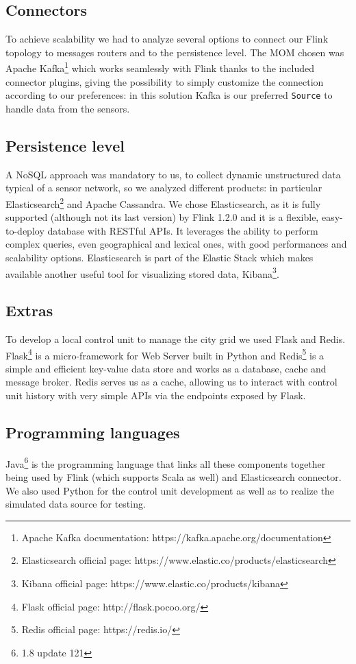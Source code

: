 \subsection{Connectors}
To achieve scalability we had to analyze several options to connect our Flink topology to messages routers and to the persistence level. The MOM chosen was Apache Kafka\footnote{Apache Kafka documentation: https://kafka.apache.org/documentation} which works seamlessly with Flink thanks to the included connector plugins, giving the possibility to simply customize the connection according to our preferences: in this solution Kafka is our preferred \texttt{Source} to handle data from the sensors. 
\subsection{Persistence level}
A NoSQL approach was mandatory to us, to collect dynamic unstructured data typical of a sensor network, so we analyzed different products: in particular Elasticsearch\footnote{Elasticsearch official page: https://www.elastic.co/products/elasticsearch} and Apache Cassandra. We chose Elasticsearch, as it is fully supported (although not its last version) by Flink 1.2.0 and it is a flexible, easy-to-deploy database with RESTful APIs. It leverages the ability to perform complex queries, even geographical and lexical ones, with good performances and scalability options. Elasticsearch is part of the Elastic Stack which makes available another useful tool for visualizing stored data, Kibana\footnote{Kibana official page: https://www.elastic.co/products/kibana}.

\subsection{Extras}
To develop a local control unit to manage the city grid we used Flask and Redis. Flask\footnote{Flask official page: http://flask.pocoo.org/} is a micro-framework for Web Server built in Python and Redis\footnote{Redis official page: https://redis.io/} is a simple and efficient key-value data store and works as a database, cache and message broker. Redis serves us as a cache, allowing us to interact with control unit history with very simple APIs via the endpoints exposed by Flask.

\subsection{Programming languages}
Java\footnote{1.8 update 121} is the programming language that links all these components together being used by Flink (which supports Scala as well) and Elasticsearch connector. We also used Python for the control unit development as well as to realize the simulated data source for testing.


